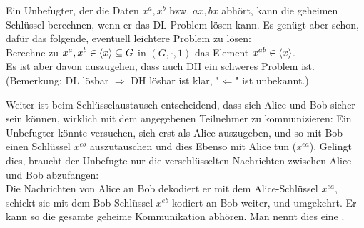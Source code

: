 \begin{bem}
	Ein Unbefugter, der die Daten $x^a, x^b$ bzw. $ax,bx$ abhört, kann die geheimen Schlüssel berechnen, wenn er das DL-Problem lösen kann. Es genügt aber schon, dafür das folgende, eventuell leichtere Problem zu lösen: \\
	Berechne zu $x^a, x^b \in \langle x\rangle \subseteq G$ in $(G,\cdot,1)$ das Element $x^{ab} \in \langle x\rangle$. \\
	Es ist aber davon auszugehen, dass auch DH ein schweres Problem ist. \\
	(Bemerkung: DL lösbar $\Rightarrow$ DH lösbar ist klar, "$\Leftarrow$" ist unbekannt.)
\end{bem}

\begin{bem}
	Weiter ist beim Schlüsselaustausch entscheidend, dass sich Alice und Bob sicher sein können, wirklich mit dem angegebenen Teilnehmer zu kommunizieren: Ein Unbefugter könnte versuchen, sich erst als Alice auszugeben, und so mit Bob einen Schlüssel $x^{eb}$ auszutauschen und dies Ebenso mit Alice tun ($x^{ea}$). Gelingt dies, braucht der Unbefugte nur die verschlüsselten Nachrichten zwischen Alice und Bob abzufangen: \\
	Die Nachrichten von Alice an Bob dekodiert er mit dem Alice-Schlüssel $x^{ea}$, schickt sie mit dem Bob-Schlüssel $x^{eb}$ kodiert an Bob weiter, und umgekehrt. Er kann so die gesamte geheime Kommunikation abhören. Man nennt dies eine .
\end{bem}